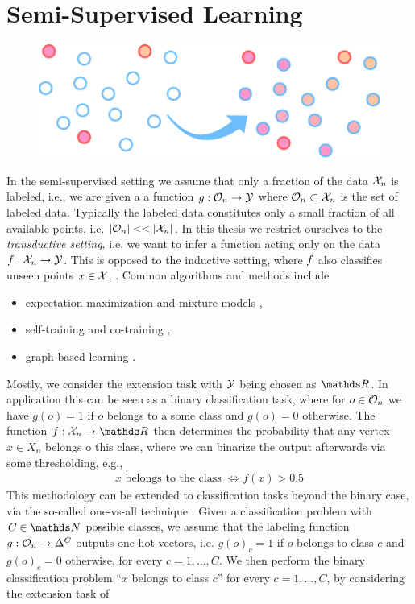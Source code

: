 \section{Semi-Supervised Learning}\label{sec:PSSL}
\begin{figure}
\centering
\includegraphics[width=.5\textwidth]{atelier/paradigms/SSL.pdf}
\end{figure}
%
In the semi-supervised setting we assume that only a fraction of the data $\mathcal{X}_n$ is labeled, i.e., we are given a a function $g:\mathcal{O}_n\to\mathcal{\mathcal{Y}}$ where $\mathcal{O}_n\subset\mathcal{X}_n$ is the set of labeled data. Typically the labeled data constitutes only a small fraction of all available points, i.e. $\left|\mathcal{O}_n\right|<<\left|\mathcal{X}_n\right|$. In this thesis we restrict ourselves to the \emph{transductive setting}, i.e. we want to infer a function acting only on the data $f: \mathcal{X}_n\to \mathcal{\mathcal{Y}}$. This is opposed to the inductive setting, where $f$ also classifies unseen points $x\in\mathcal{X}$, \cite{zhu2005semi}. Common algorithms and methods include
%
\begin{itemize}
\item expectation maximization and mixture models \cite{dempster1977maximum,cozman2003semi},
\item self-training and co-training \cite{blum1998combining},
\item graph-based learning \cite{zhu2005semi}.
\end{itemize}
%
%
Mostly, we consider the extension task with $\mathcal{\mathcal{Y}}$ being chosen as $\R$. In application this can be seen as a binary classification task, where for $o\in\mathcal{O}_n$ we have $g(o)=1$ if $o$ belongs to a some class and $g(o)=0$ otherwise. The function $f:\Inp_n\to\R$ then determines the probability that any vertex $x\in X_n$ belongs o this class, where we can binarize the output afterwards via some thresholding, e.g.,
%
\begin{align*}
x \text{ belongs to the class } \Leftrightarrow f(x) > 0.5
\end{align*}
%
This methodology can be extended to classification tasks beyond the binary case, via the so-called one-vs-all technique \cite{zhu2003semi}. Given a classification problem with $C\in\N$ possible classes, we assume that the labeling function $g:\mathcal{O}_n\to \Delta^C$ outputs one-hot vectors, i.e. $g(o)_c =1$ if $o$ belongs to class $c$ and $g(o)_c=0$ otherwise, for every $c = 1,\ldots, C$. We then perform the binary classification problem \enquote{$x$ belongs to class $c$} for every $c=1,\ldots,C$, by considering the extension task of 
